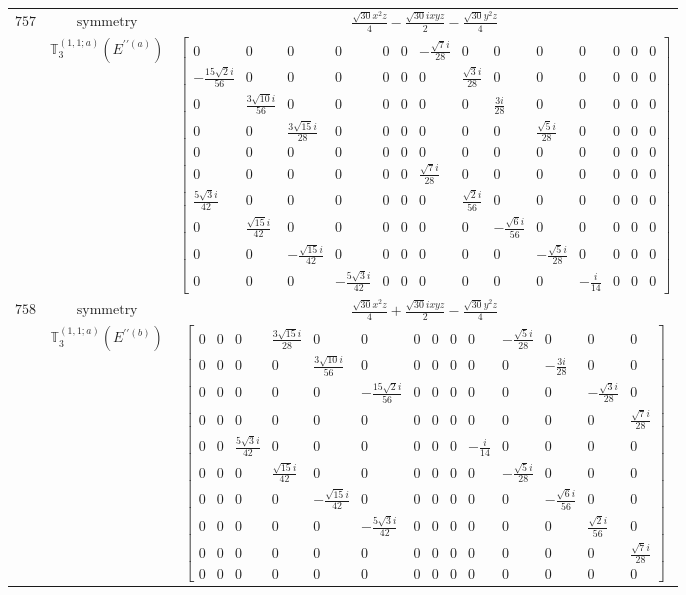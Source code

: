 \documentclass[fleqn,8pt,landscape]{jsarticle}
\begin{document}
\begin{longtable}{ccc}
$ 757 $ & $ \text{symmetry} $ & $ \frac{\sqrt{30} x^{2} z}{4} - \frac{\sqrt{30} i x y z}{2} - \frac{\sqrt{30} y^{2} z}{4} $ \\
$  $ & $ \mathbb{T}_{3}^{(1,1;a)}(E^{\prime\prime(a)}) $ & $ \begin{bmatrix} 0 & 0 & 0 & 0 & 0 & 0 & - \frac{\sqrt{7} i}{28} & 0 & 0 & 0 & 0 & 0 & 0 & 0 \\ - \frac{15 \sqrt{2} i}{56} & 0 & 0 & 0 & 0 & 0 & 0 & \frac{\sqrt{3} i}{28} & 0 & 0 & 0 & 0 & 0 & 0 \\ 0 & \frac{3 \sqrt{10} i}{56} & 0 & 0 & 0 & 0 & 0 & 0 & \frac{3 i}{28} & 0 & 0 & 0 & 0 & 0 \\ 0 & 0 & \frac{3 \sqrt{15} i}{28} & 0 & 0 & 0 & 0 & 0 & 0 & \frac{\sqrt{5} i}{28} & 0 & 0 & 0 & 0 \\ 0 & 0 & 0 & 0 & 0 & 0 & 0 & 0 & 0 & 0 & 0 & 0 & 0 & 0 \\ 0 & 0 & 0 & 0 & 0 & 0 & \frac{\sqrt{7} i}{28} & 0 & 0 & 0 & 0 & 0 & 0 & 0 \\ \frac{5 \sqrt{3} i}{42} & 0 & 0 & 0 & 0 & 0 & 0 & \frac{\sqrt{2} i}{56} & 0 & 0 & 0 & 0 & 0 & 0 \\ 0 & \frac{\sqrt{15} i}{42} & 0 & 0 & 0 & 0 & 0 & 0 & - \frac{\sqrt{6} i}{56} & 0 & 0 & 0 & 0 & 0 \\ 0 & 0 & - \frac{\sqrt{15} i}{42} & 0 & 0 & 0 & 0 & 0 & 0 & - \frac{\sqrt{5} i}{28} & 0 & 0 & 0 & 0 \\ 0 & 0 & 0 & - \frac{5 \sqrt{3} i}{42} & 0 & 0 & 0 & 0 & 0 & 0 & - \frac{i}{14} & 0 & 0 & 0 \end{bmatrix} $ \\ \hline
$ 758 $ & $ \text{symmetry} $ & $ \frac{\sqrt{30} x^{2} z}{4} + \frac{\sqrt{30} i x y z}{2} - \frac{\sqrt{30} y^{2} z}{4} $ \\
$  $ & $ \mathbb{T}_{3}^{(1,1;a)}(E^{\prime\prime(b)}) $ & $ \begin{bmatrix} 0 & 0 & 0 & \frac{3 \sqrt{15} i}{28} & 0 & 0 & 0 & 0 & 0 & 0 & - \frac{\sqrt{5} i}{28} & 0 & 0 & 0 \\ 0 & 0 & 0 & 0 & \frac{3 \sqrt{10} i}{56} & 0 & 0 & 0 & 0 & 0 & 0 & - \frac{3 i}{28} & 0 & 0 \\ 0 & 0 & 0 & 0 & 0 & - \frac{15 \sqrt{2} i}{56} & 0 & 0 & 0 & 0 & 0 & 0 & - \frac{\sqrt{3} i}{28} & 0 \\ 0 & 0 & 0 & 0 & 0 & 0 & 0 & 0 & 0 & 0 & 0 & 0 & 0 & \frac{\sqrt{7} i}{28} \\ 0 & 0 & \frac{5 \sqrt{3} i}{42} & 0 & 0 & 0 & 0 & 0 & 0 & - \frac{i}{14} & 0 & 0 & 0 & 0 \\ 0 & 0 & 0 & \frac{\sqrt{15} i}{42} & 0 & 0 & 0 & 0 & 0 & 0 & - \frac{\sqrt{5} i}{28} & 0 & 0 & 0 \\ 0 & 0 & 0 & 0 & - \frac{\sqrt{15} i}{42} & 0 & 0 & 0 & 0 & 0 & 0 & - \frac{\sqrt{6} i}{56} & 0 & 0 \\ 0 & 0 & 0 & 0 & 0 & - \frac{5 \sqrt{3} i}{42} & 0 & 0 & 0 & 0 & 0 & 0 & \frac{\sqrt{2} i}{56} & 0 \\ 0 & 0 & 0 & 0 & 0 & 0 & 0 & 0 & 0 & 0 & 0 & 0 & 0 & \frac{\sqrt{7} i}{28} \\ 0 & 0 & 0 & 0 & 0 & 0 & 0 & 0 & 0 & 0 & 0 & 0 & 0 & 0 \end{bmatrix} $ \\ \hline

\end{longtable}
\end{document}
